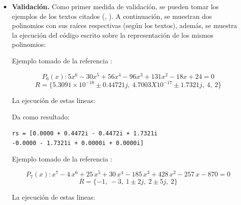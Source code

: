 \documentclass[11pt, spanish]{article}
\begin{document}
\begin{itemize}


\newpage





\item \textbf{Validación.} Como primer medida de validación, se pueden tomar los ejemplos de los textos citados (\cite{rosloniec2008fundamental}, \cite{miller2014numerical}). A continuación, se muestran dos polinomios con sus raíces respectivas (según los textos), además, se muestra la ejecución del código escrito sobre la representación de los mismos polinomios:

Ejemplo tomado de la referencia \cite{miller2014numerical}:

$$P_6(x) : 5x^6 - 30x^5 +56x^4 - 96x^3 + 131x^2-18x+24 = 0$$
$$R = \{ 5.3091 \times 10^{-18} \pm 0.44721j,\ 4.7003 X 10^{-17} \pm 1.7321j,\ 4,\  2\}$$

La ejecución de estas lineas:



Da como resultado:

\texttt{rs = [0.0000 + 0.4472i    - 0.4472i   + 1.7321i} \\
\texttt{-0.0000 - 1.7321i    + 0.0000i   + 0.0000i]}


Ejemplo tomado de la referencia \cite{rosloniec2008fundamental}:

$$P_7(x) : x^7 - 4\, x^6 + 25\, x^5 + 30\, x^4 - 185\, x^3 + 428\, x^2 - 257\, x - 870 = 0$$
$$R = \{ -1,\ -3,\ 1 \pm 2j,\ 2 \pm 5j,\ 2 \}$$

La ejecución de estas lineas:


\end{itemize}
\end{document}
